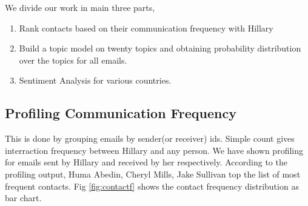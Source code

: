 \documentclass{article} %
\begin{document}
We divide our work in main three parts,
\begin{enumerate}
\item Rank contacts based on their communication frequency with Hillary
\item Build a topic model on twenty topics and obtaining probability distribution over the topics for all emails.
\item Sentiment Analysis for various countries.
\end{enumerate}


\subsection{Profiling Communication Frequency}

This is done by grouping emails by sender(or receiver) ids. Simple count gives interraction frequency between Hillary and any person. We have shown profiling for emails sent by Hillary and received by her respectively. According to the profiling output, Huma Abedin, Cheryl Mills, Jake Sullivan top the list of most frequent contacts. Fig \ref{fig:contactf} shows the contact frequency distribution as bar chart.
\end{document}
